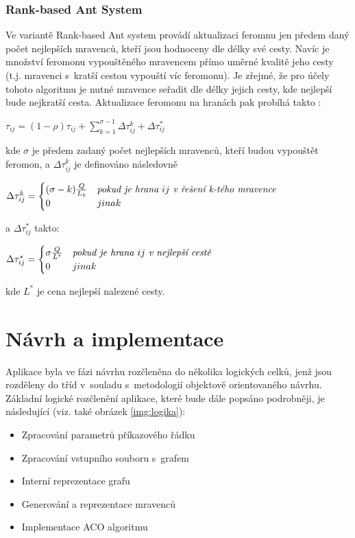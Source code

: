 \documentclass[a4paper, 12pt]{article}
\begin{document}
\subsubsection{Rank-based Ant System}
Ve variantě Rank-based Ant system provádí aktualizaci feromnu jen předem daný počet nejlepších mravenců, kteří jsou hodnoceny dle délky své cesty.
Navíc je množství feromonu vypouštěného mravencem přímo uměrné kvalitě jeho cesty (t.j. mravenci s~kratší cestou vypouští víc feromonu). Je zřejmé,
že pro účely tohoto algoritmu je nutné mravence seřadit dle délky jejich cesty, kde nejlepší bude nejkratší cesta. Aktualizace feromonu na hranách pak
probíhá takto \cite{aco:ranked}:
\begin{center}
  $\tau_{ij}=(1-\rho)\tau_{ij}+\sum\limits_{k=1}^{\sigma-1}\Delta\tau_{ij}^k + \Delta\tau_{ij}^*$
\end{center}
  kde $\sigma$ je předem zadaný počet nejlepších mravenců, kteří budou vypouštět feromon, a $\Delta\tau_{ij}^k$ je definováno následovně
\begin{center}
  $\Delta\tau_{ij}^k = 
 \begin{cases}
  (\sigma - k)\frac{Q}{L_k} & \emph{pokud je hrana } ij \emph{ v~řešení k-tého mravence}\\
  0 & jinak
 \end{cases}
$
\end{center}
a $\Delta\tau_{ij}^*$ takto:
\begin{center}
$\Delta\tau_{ij}^* = 
 \begin{cases}
  \sigma\frac{Q}{L^*} & \emph{pokud je hrana } ij \emph{ v~nejlepší cestě}\\
  0 & jinak
 \end{cases}
   $
\end{center}
kde $L^*$ je cena nejlepší nalezené cesty.

\section{Návrh a implementace}
\label{sec:design}
Aplikace byla ve fázi návrhu rozčleněna do několika logických celků, jenž jsou rozděleny do tříd v~souladu s~metodologií
objektově orientovaného návrhu. Základní logické rozčlenění aplikace, které bude dále popsáno podrobněji, je následující (viz. také obrázek
\ref{img:logika}):
\begin{itemize}
  \item Zpracování parametrů příkazového řádku
  \item Zpracování vstupního souboru s~grafem
  \item Interní reprezentace grafu
  \item Generování a reprezentace mravenců
  \item Implementace ACO algoritmu
\end{itemize}
\end{document}
